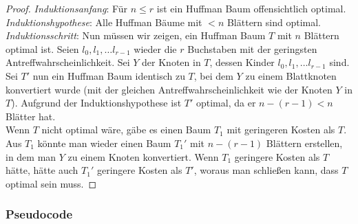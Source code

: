 \documentclass[a4paper,10pt,ngerman]{scrartcl}
\begin{document}
    \begin{proof} %
        \textit{Induktionsanfang}:
        Für $n \le r$ ist ein Huffman Baum offensichtlich optimal. \\
        \textit{Induktionshypothese}: Alle Huffman Bäume mit $< n$ Blättern sind optimal. \\
        \textit{Induktionsschritt}: Nun müssen wir zeigen, ein Huffman Baum $T$ mit $n$ Blättern optimal ist.
        Seien $l_0, l_1, \dots l_{r - 1}$ wieder die $r$ Buchstaben mit der geringsten Antreffwahrscheinlichkeit.
        Sei $Y$ der Knoten in $T$, dessen Kinder $l_0, l_1, \dots l_{r - 1}$ sind.
        Sei $T'$ nun ein Huffman Baum identisch zu $T$, bei dem $Y$ zu einem Blattknoten konvertiert wurde (mit der gleichen Antreffwahrscheinlichkeit wie der Knoten $Y$ in $T$).
        Aufgrund der Induktionshypothese ist $T'$ optimal, da er $n - (r - 1) < n$ Blätter hat.\\
        Wenn $T$ nicht optimal wäre, gäbe es einen Baum $T_1$ mit geringeren Kosten als $T$. Aus $T_1$ könnte man wieder einen Baum $T_1'$ mit $n - (r - 1)$ Blättern erstellen, in dem man $Y$ zu einem Knoten konvertiert. Wenn $T_1$ geringere Kosten als $T$ hätte, hätte auch $T_1'$ geringere Kosten als $T'$, woraus man schließen kann, dass $T$ optimal sein muss.
    \end{proof}

    \subsubsection{Pseudocode}
\end{document}
